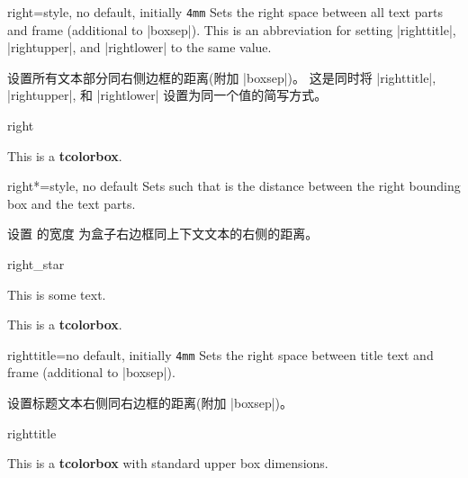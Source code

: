\begin{docTcbKey}{right}{=}{style, no default, initially \texttt{4mm}}
  Sets the right space between all text parts and frame (additional to |boxsep|).
  This is an abbreviation for setting
  |righttitle|, |rightupper|, and |rightlower| to the same value.

设置所有文本部分同右侧边框的距离(附加 |boxsep|)。
这是同时将 |righttitle|, |rightupper|, 和 |rightlower| 设置为同一个值的简写方式。
\begin{exdispExample}{right}

\begin{tcolorbox}[width=5cm,right=2cm]
This is a \textbf{tcolorbox}.
\end{tcolorbox}
\end{exdispExample}
\end{docTcbKey}





  
\begin{docTcbKey}[][doc new=2017-02-16]{right*}{=}{style, no default}
  Sets  such that  is the distance between
  the right bounding box and the text parts.

设置  的宽度  为盒子右边框同上下文文本的右侧的距离。
\begin{exdispExample}{right_star}

\flushright This is some text.
\begin{tcolorbox}[grow to right by=5mm,right*=0mm,
  halign=right,enhanced,show bounding box]
This is a \textbf{tcolorbox}.
\end{tcolorbox}
\end{exdispExample}
\end{docTcbKey}



\begin{docTcbKey}{righttitle}{=}{no default, initially \texttt{4mm}}
  Sets the right space between title text and frame (additional to |boxsep|).

设置标题文本右侧同右边框的距离(附加 |boxsep|)。
  \begin{exdispExample}{righttitle}

\begin{tcolorbox}[width=5cm,righttitle=2cm,title=My very long title text]
This is a \textbf{tcolorbox} with standard upper box dimensions.
\end{tcolorbox}
\end{exdispExample}
\end{docTcbKey}


